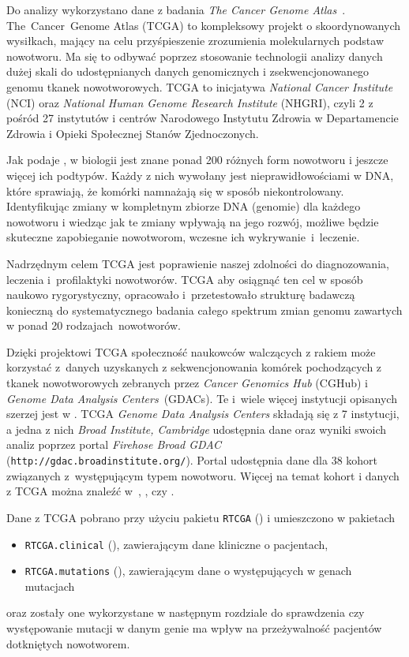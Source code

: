 Do analizy wykorzystano dane z badania \textit{The Cancer Genome Atlas}~\cite{broad}. The~Cancer~Genome Atlas (TCGA) to kompleksowy projekt o skoordynowanych wysiłkach, mający na celu przyśpieszenie zrozumienia molekularnych podstaw nowotworu. Ma się to odbywać poprzez stosowanie technologii analizy danych dużej skali do udostępnianych danych genomicznych i zsekwencjonowanego genomu tkanek nowotworowych. TCGA to inicjatywa \textit{National Cancer Institute} (NCI) oraz \textit{National Human Genome Research Institute} (NHGRI), czyli 2 z pośród 27 instytutów i centrów Narodowego Instytutu Zdrowia w Departamencie Zdrowia i Opieki Społecznej Stanów Zjednoczonych.

Jak podaje \cite{patrycja}, w biologii jest znane ponad 200 różnych form nowotworu i jeszcze więcej ich podtypów. Każdy z nich wywołany jest nieprawidłowościami w DNA, które sprawiają, że komórki namnażają się w sposób niekontrolowany. Identyfikując zmiany w kompletnym zbiorze DNA (genomie) dla każdego nowotworu i wiedząc jak te zmiany wpływają na jego rozwój, możliwe będzie skuteczne zapobieganie nowotworom, wczesne ich wykrywanie~i~leczenie. 

Nadrzędnym celem TCGA jest poprawienie naszej zdolności do diagnozowania, leczenia i~profilaktyki nowotworów. TCGA aby osiągnąć ten cel w sposób naukowo rygorystyczny, opracowało i~przetestowało strukturę badawczą konieczną do systematycznego badania całego spektrum zmian genomu zawartych w ponad 20 rodzajach~nowotworów.

Dzięki projektowi TCGA społeczność naukowców walczących z rakiem może korzystać z~danych uzyskanych z sekwencjonowania komórek pochodzących z tkanek nowotworowych zebranych przez \textit{Cancer Genomics Hub} (CGHub) i \textit{Genome Data Analysis Centers}~(GDACs). Te i~wiele więcej instytucji opisanych szerzej jest w \cite{patrycja}. TCGA \textit{Genome Data Analysis Centers} składają się z 7 instytucji, a jedna z nich \textit{Broad Institute, Cambridge} udostępnia dane oraz wyniki swoich analiz poprzez portal \textit{Firehose Broad GDAC} (\texttt{http://gdac.broadinstitute.org/}). Portal udostępnia dane dla 38 kohort związanych z~występującym typem nowotworu. Więcej na temat kohort i danych z TCGA można znaleźć w~\cite{chin1}, \cite{chin2}, \cite{future} czy \cite{patrycja}. 

Dane z TCGA pobrano przy użyciu pakietu \texttt{RTCGA} (\cite{kosa1}) i umieszczono w pakietach
\begin{itemize}
\item \texttt{RTCGA.clinical} (\cite{kosa2}), zawierającym dane kliniczne o pacjentach,
\item \texttt{RTCGA.mutations} (\cite{kosa3}), zawierającym dane o występujących w genach mutacjach
\end{itemize} 
oraz zostały one wykorzystane w następnym rozdziale do sprawdzenia czy występowanie mutacji w danym genie ma wpływ na przeżywalność pacjentów dotkniętych nowotworem.

